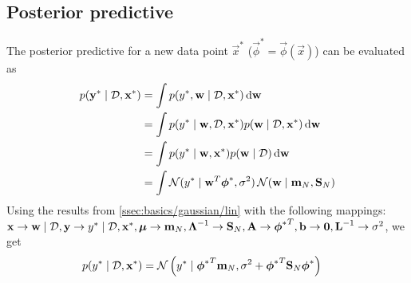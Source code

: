 \subsection{Posterior predictive}
The posterior predictive for a new data point $\vec x^\ast$ ($\vec \phi^\ast = \vec \phi(\vec x)$) can be evaluated as
\begin{align}
	p(\vec y^\ast \given \mathcal D, \vec x^\ast)	&= \int p(y^\ast, \vec w \given \mathcal D, \vec x^\ast)\,\mathrm d\vec w \\
													&= \int p(y^\ast \given \vec w, \mathcal D, \vec x^\ast) p(\vec w \given \mathcal D, \vec x^\ast)\,\mathrm d\vec w \\
													&= \int p(y^\ast \given \vec w, \vec x^\ast) p(\vec w \given \mathcal D)\,\mathrm d\vec w \\
													&= \int \Gauss(y^\ast \given \vec w^T \vec \phi^\ast, \sigma^2) \Gauss(\vec w \given \vec m_N, \vec S_N)
\end{align}
Using the results from \ref{ssec:basics/gaussian/lin} with the following mappings: $\vec x \to \vec w \given \mathcal D, \vec y \to y^\ast \given \mathcal D, \vec x^\ast, \vec \mu \to \vec m_N, \vec \Lambda^{-1} \to \vec S_N, \vec A \to {\vec \phi^\ast}^T, \vec b \to \vec 0, \vec L^{-1} \to \sigma^2$, we get
\begin{align}
	p(y^\ast \given \mathcal D, \vec x^\ast)	&= \Gauss\left(y^\ast \given {\vec\phi^\ast}^T \vec m_N, \sigma^2 + {\vec\phi^\ast}^T \vec S_N \vec\phi^\ast\right)
\end{align}

